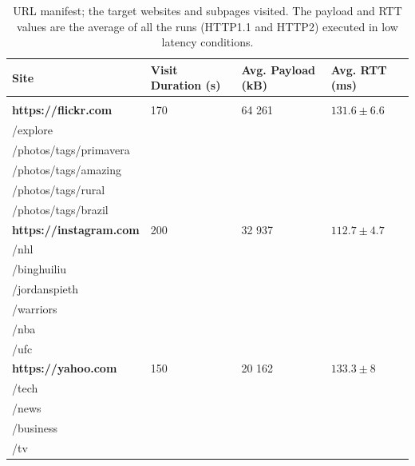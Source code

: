 \documentclass{article}
\begin{document}
\begin{table}[h!]
    \caption{URL manifest; the target websites and subpages visited. The payload and RTT values are the average of all the runs (HTTP1.1 and HTTP2) executed in low latency conditions.}
    \label{table:url_manifest}
    \begin{tabular}{lK{2.6cm}K{2.5cm}K{2.25cm}}
        \textbf{Site} & \textbf{Visit Duration} (s) & \textbf{Avg. Payload} (kB) & \textbf{Avg. RTT} (ms) \\
        \hline \vspace{-3mm}\\
        \textbf{https://flickr.com} & 170 & 64 261 & $131.6\pm6.6$ \\
        \hspace{1em} /explore \\
        \hspace{1em} /photos/tags/primavera \\
        \hspace{1em} /photos/tags/amazing \\
        \hspace{1em} /photos/tags/rural \\
        \hspace{1em} /photos/tags/brazil \vspace{1mm}\\
        \textbf{https://instagram.com} & 200 & 32 937 & $112.7\pm4.7$ \\
        \hspace{1em} /nhl \\
        \hspace{1em} /binghuiliu \\
        \hspace{1em} /jordanspieth \\
        \hspace{1em} /warriors \\
        \hspace{1em} /nba \\
        \hspace{1em} /ufc \vspace{1mm}\\
        \textbf{https://yahoo.com} & 150 & 20 162 & $133.3\pm8$ \\
        \hspace{1em} /tech \\
        \hspace{1em} /news \\
        \hspace{1em} /business \\
        \hspace{1em} /tv \vspace{1mm}\\
    \end{tabular}
\end{table}
\end{document}
